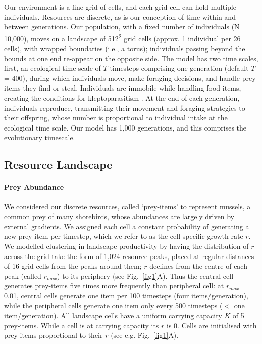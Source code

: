\begin{refsection}[sorting=nyt]
Our environment is a fine grid of cells, and each grid cell can hold multiple individuals.
Resources are discrete, as is our conception of time within and between generations. 
Our population, with a fixed number of individuals (N = 10,000), moves on a landscape of 512\textsuperscript{2} grid cells (approx. 1 individual per 26 cells), with wrapped boundaries (i.e., a torus); individuals passing beyond the bounds at one end re-appear on the opposite side.
The model has two time scales, first, an ecological time scale of $T$ timesteps comprising one generation (default $T$ = 400), during which individuals move, make foraging decisions, and handle prey-items they find or steal.
Individuals are immobile while handling food items, creating the conditions for kleptoparasitism \citep{brockmann1979,ruxton1992}.
At the end of each generation, individuals reproduce, transmitting their movement and foraging strategies to their offspring, whose number is proportional to individual intake at the ecological time scale.
Our model has 1,000 generations, and this comprises the evolutionary timescale.

\subsection*{Resource Landscape}

\paragraph{Prey Abundance}

We considered our discrete resources, called `prey-items' to represent mussels, a common prey of many shorebirds, whose abundances are largely driven by external gradients.
We assigned each cell a constant probability of generating a new prey-item per timestep, which we refer to as the cell-specific growth rate $r$.
We modelled clustering in landscape productivity by having the distribution of $r$ across the grid take the form of 1,024 resource peaks, placed at regular distances of 16 grid cells from the peaks around them; $r$ declines from the centre of each peak (called $r_{max}$) to its periphery (see Fig.~\ref{fig1}A).
Thus the central cell generates prey-items five times more frequently than peripheral cell: at $r_{max}$ = 0.01, central cells generate one item per 100 timesteps (four items/generation), while the peripheral cells generate one item only every 500 timesteps ($<$ one item/generation).
All landscape cells have a uniform carrying capacity $K$ of 5 prey-items.
While a cell is at carrying capacity its $r$ is 0.
Cells are initialised with prey-items proportional to their $r$ (see e.g. Fig.~\ref{fig1}A).


\end{refsection}
